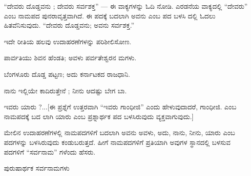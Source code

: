 
\indent “ದೇವರು ದೊಡ್ಡವನು ; ದೇವರು ಸರ್ವಶಕ್ತ” — ಈ ವಾಕ್ಯಗಳನ್ನು ಓದಿ ನೋಡಿ. ಎರಡನೆಯ ವಾಕ್ಯದಲ್ಲಿ “ದೇವರು” ಎಂಬ ನಾಮಪದ ಪುನರಾವೃತ್ತವಾಗಿದೆ. ಈ ಪದಕ್ಕೆ ಬದಲಾಗಿ ಅವನು ಎಂಬ ಪದ ಬಳಸಿ ದಲ್ಲಿ ಓದಲು ಹಿತವೆನಿಸುವುದು. “ದೇವರು ದೊಡ್ಡವನು; ಅವನು ಸರ್ವಶಕ್ತ.”\par

\noindent\hspace*{2.2em}ಇದೇ ರೀತಿಯ ಹಲವು ಉದಾಹರಣೆಗಳನ್ನು ಪರಿಶೀಲಿಸೋಣ.\par

\vspace{2.5pt plus 3pt minus 0.5pt}\noindent\hspace*{1.2em}\hspace{0.55em}ಪಾರ್ವತಿಯು ಶಿವನ ಹೆಂಡತಿ; ಅವಳು ಪರ್ವತೇಶ್ವರನ ಮಗಳು.\par

\vspace{2.5pt plus 3pt minus 0.5pt}\noindent\hspace*{1.2em}\hspace{0.55em}ಬೆಂಗಳೂರು ದೊಡ್ಡ ಪಟ್ಟಣ; ಅದು ಕರ್ನಾಟಕದ ರಾಜಧಾನಿ.\par

\vspace{2.5pt plus 3pt minus 0.5pt}\noindent\hspace*{1.2em}\hspace{0.55em}ನಾನು ಇಲ್ಲಿಯೇ ಕಾದಿರುತ್ತೇನೆ ; ನೀನು ಆದಷ್ಟು ಬೇಗ ಬಾ.\par

\vspace{2.5pt plus 3pt minus 0.5pt}\noindent\hspace*{1.2em}\hspace{0.55em}ಇವರು ಯಾರು ?...{[}ಈ ಪ್ರಶ್ನೆಗೆ ಉತ್ತರವಾಗಿ “ಇವರು ಗಾಂಧೀಜಿ” ಎಂದು ಹೇಳುವುದಾದರೆ, ಗಾಂಧೀಜಿ. ಎಂಬ ನಾಮಪದಕ್ಕೆ ಬದ ಲಾಗಿ ಯಾರು ಎಂಬ ಪ್ರಶ್ನಾರ್ಥಕ ಪದ ಬಳಸಿರುವುದು ವ್ಯಕ್ತವಾಗುವುದು.{]}\par

\indent ಮೇಲಿನ ಉದಾಹರಣೆಗಳಲ್ಲಿ ನಾಮಪದಗಳಿಗೆ ಬದಲಾಗಿ ಅವನು ಅವಳು, ಅದು, ನಾನು, ನೀನು, ಯಾರು ಎಂಬ ಪದಗಳನ್ನು ಬಳಸಿರುವುದು ಕಂಡುಬರುತ್ತದೆ. ಹೀಗೆ ನಾಮಪದಗಳಿಗೆ ಪ್ರತಿಯಾಗಿ ಅವುಗಳ ಸ್ಥಾನದಲ್ಲಿ ಬಳಸುವ ಪದಗಳಿಗೆ “ಸರ್ವನಾಮ” ಗಳೆಂದು ಹೆಸರು.\par


\vspace{2.5pt plus 3pt minus 0.5pt}\noindent\hspace*{1.2em}\hspace{0.55em}ಪುರುಷಾರ್ಥಕ ಸರ್ವನಾಮಗಳು\par

